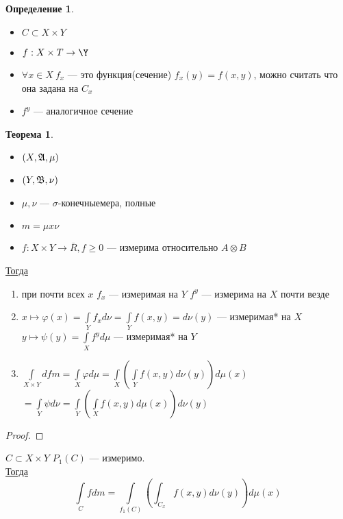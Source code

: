 \documentclass[english]{article}
\newcommand{\todo}{{\color{red}\fbox{\text{Доделать}}}}
\theoremstyle{plain}
\theoremstyle{remark}
\theoremstyle{definition}
\newtheorem{theorem}{Теорема}[section]
\newtheorem*{definition}{Определение}
\begin{document}
\begin{definition}
\-
\begin{itemize}
\item \(C \subset X \times Y\)
\item \(f: X \times T \to \Y\)
\item \(\forall x \in X\ f_x\) --- это функция(сечение) \(f_x(y) = f(x, y)\), можно считать что она задана на \(C_x\)
\item \(f^y\) --- аналогичное сечение
\end{itemize}
\end{definition}
\begin{theorem}
\-
\begin{itemize}
\item \((X, \mathfrak{A}, \mu)\)
\item \((Y, \mathfrak{B}, \nu)\)
\item \(\mu, \nu\) --- \(\sigma\)-конечныемера, полные
\item \(m = \mu x \nu\)
\item \(f: X \times Y \to \overline{R}, f \ge 0\) --- измерима относительно \(A\otimes B\)
\end{itemize}
\uline{Тогда}
\begin{enumerate}
\item при  почти всех \(x\) \(f_x\) --- измеримая на \(Y\) \color{blue}\(f^y\) --- измерима на \(X\) почти везде\color{black}
\item \(x \mapsto \varphi(x)=\int\limits_Y f_x d\nu = \int\limits_Y f(x, y) = d\nu(y)\) --- измеримая* на \(X\) \\
\color{blue}\(y \mapsto \psi(y) = \int\limits_X f^y d\mu\) --- измеримая* на \(Y\)\color{black}
\item \(\int\limits_{X \times Y} d fm = \int\limits_X \varphi d\mu = \int\limits_X\left(\int\limits_Y f(x, y) d\nu(y)\right)d\mu(x)\) \\
\color{blue}\(= \int\limits_Y \psi d\nu = \int\limits_Y\left(\int\limits_X f(x, y) d\mu(x)\right)d\nu(y)\)
\end{enumerate}
\end{theorem}
\begin{proof}
\todo
\end{proof}
\begin{corllary}
\(C \subset X \times Y\) \(P_1(C)\) --- измеримо. \\
\uline{Тогда} \[ \int\limits_C f dm = \int\limits_{f_1(C)}\left(\int_{C_x} f(x, y) d\nu(y)\right)d\mu(x) \]
\end{corllary}
\end{document}
